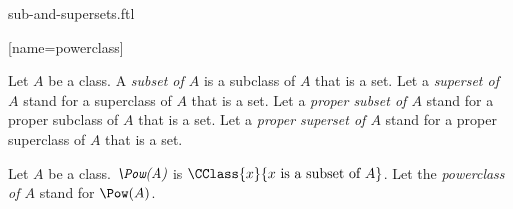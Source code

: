 \documentclass{stex}
\begin{document}
\begin{smodule}{sub-and-supersets.ftl}


[name=powerclass]{}


\begin{definition*}[forthel,for={subset,superset,proper subset,proper superset}]
  Let $A$ be a class.
  A \emph{subset of $A$} is a subclass of $A$ that is a set.
  Let a \emph{superset of $A$} stand for a superclass of $A$ that is a set.
  Let a \emph{proper subset of $A$} stand for a proper subclass of $A$ that is a set.
  Let a \emph{proper superset of $A$} stand for a proper superclass of $A$ that is a set.
\end{definition*}

\begin{definition*}[forthel,for=powerclass]
  Let $A$ be a class.
  $\emph{\Pow(A)}$ is $\CClass{x}{x\text{ is a subset of }A}$.
  Let the \emph{powerclass of $A$} stand for $\Pow(A)$.
\end{definition*}

\end{smodule}
\end{document}

